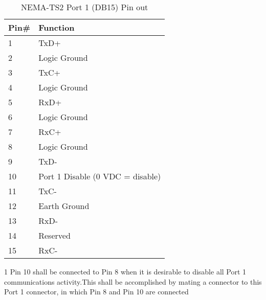 \documentclass[]{article}
\begin{document}
\begin{table}[h]		
	\centering
	\footnotesize
	\begin{threeparttable}
		\begin{tabular}{@{}ll@{}}
			\toprule
			\textbf{Pin\#}     & \textbf{Function}                          \\ \midrule
			1                  & TxD+                                       \\
			2                  & Logic Ground                               \\
			3                  & TxC+                                       \\
			4                  & Logic Ground                               \\
			5                  & RxD+                                       \\
			6                  & Logic Ground                               \\
			7                  & RxC+                                       \\
			8                  & Logic Ground                               \\
			9                  & TxD-                                       \\
			10                 & Port 1 Disable (0 VDC = disable) \tnote{1} \\
			11                 & TxC-                                       \\
			12                 & Earth Ground                               \\
			13                 & RxD-                                       \\
			14                 & Reserved                                   \\
			15                 & RxC-                                       \\ \bottomrule
		\end{tabular}
		\begin{tablenotes}
			\scriptsize
			\item[1] Pin 10 shall be connected to Pin 8 when it is desirable to disable all Port 1 communications activity.This shall be accomplished by mating a connector to this Port 1 connector, in which Pin 8 and Pin 10 are connected
		\end{tablenotes}
	\end{threeparttable}
	\caption{NEMA-TS2 Port 1 (DB15) Pin out}
	\label{tab:port1-pinout}
\end{table}
\end{document}
